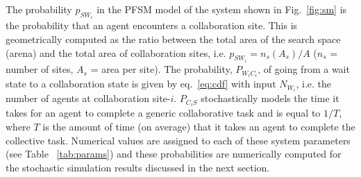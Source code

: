 \documentclass{TeXstyles/DARS/svmult}  %
\begin{document}
The probability $p_{SW_i}$ in the PFSM model of the system shown in Fig.~\ref{fig:sm} is the probability that an agent encounters a collaboration site. This is geometrically computed as the ratio between the total area of the search space (arena) and the total area of collaboration sites, i.e. $p_{SW_i} = n_s(A_s)/A$ ($n_s$ = number of sites, $A_s$ = area per site). The probability, $P_{W_iC_i}$, of going from a wait state to a collaboration state is given by eq.~\eqref{eq:cdf} with input $N_{W_i}$, i.e. the number of agents at collaboration site-$i$. $P_{C_iS}$ stochastically models the time it takes for an agent to complete a generic collaborative task and is equal to $1/T$, where $T$ is the amount of time (on average) that it takes an agent to complete the collective task. Numerical values are assigned to each of these system parameters (see Table ~\ref{tab:params}) and these probabilities are numerically computed for the stochastic simulation results discussed in the next section.
\end{document}
